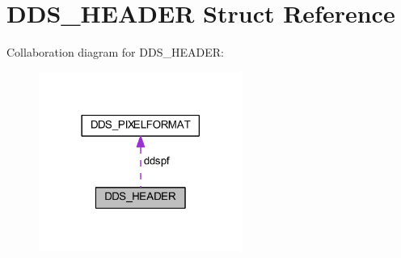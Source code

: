 \hypertarget{struct_d_d_s___h_e_a_d_e_r}{}\section{D\+D\+S\+\_\+\+H\+E\+A\+D\+ER Struct Reference}
\label{struct_d_d_s___h_e_a_d_e_r}


Collaboration diagram for D\+D\+S\+\_\+\+H\+E\+A\+D\+ER\+:
\nopagebreak
\begin{figure}[H]
\begin{center}
\leavevmode
\includegraphics[width=189pt]{struct_d_d_s___h_e_a_d_e_r__coll__graph}
\end{center}
\end{figure}
